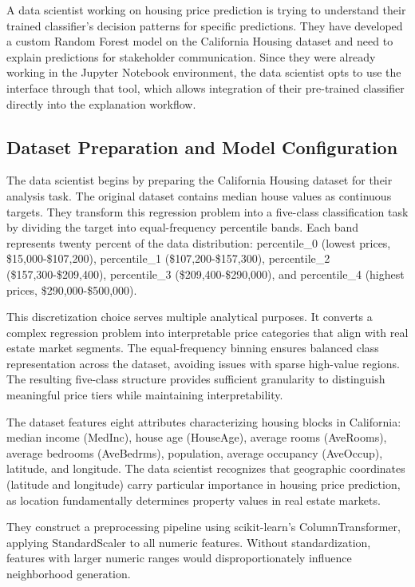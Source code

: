 A data scientist working on housing price prediction is trying to understand their trained classifier's decision patterns for specific predictions. They have developed a custom Random Forest model on the California Housing dataset and need to explain predictions for stakeholder communication. Since they were already working in the Jupyter Notebook environment, the data scientist opts to use the interface through that tool, which allows integration of their pre-trained classifier directly into the explanation workflow.

\subsection{Dataset Preparation and Model Configuration}

The data scientist begins by preparing the California Housing dataset for their analysis task. The original dataset contains median house values as continuous targets. They transform this regression problem into a five-class classification task by dividing the target into equal-frequency percentile bands. Each band represents twenty percent of the data distribution: percentile\_0 (lowest prices, \$15,000-\$107,200), percentile\_1 (\$107,200-\$157,300), percentile\_2 (\$157,300-\$209,400), percentile\_3 (\$209,400-\$290,000), and percentile\_4 (highest prices, \$290,000-\$500,000).

This discretization choice serves multiple analytical purposes. It converts a complex regression problem into interpretable price categories that align with real estate market segments. The equal-frequency binning ensures balanced class representation across the dataset, avoiding issues with sparse high-value regions. The resulting five-class structure provides sufficient granularity to distinguish meaningful price tiers while maintaining interpretability.

The dataset features eight attributes characterizing housing blocks in California: median income (MedInc), house age (HouseAge), average rooms (AveRooms), average bedrooms (AveBedrms), population, average occupancy (AveOccup), latitude, and longitude. The data scientist recognizes that geographic coordinates (latitude and longitude) carry particular importance in housing price prediction, as location fundamentally determines property values in real estate markets.

They construct a preprocessing pipeline using scikit-learn's ColumnTransformer, applying StandardScaler to all numeric features. Without standardization, features with larger numeric ranges would disproportionately influence neighborhood generation.

